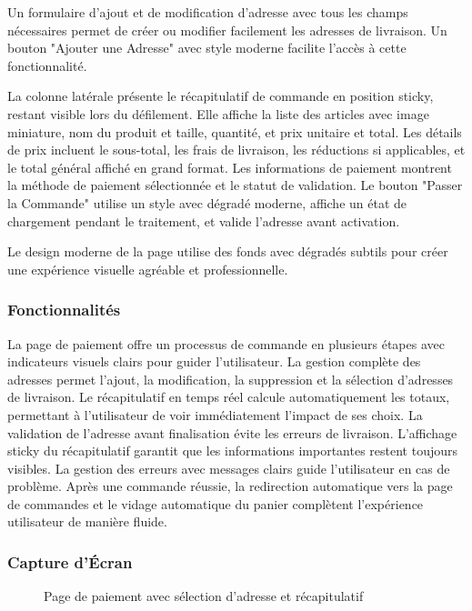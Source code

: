 \documentclass[12pt,a4paper]{article}
\begin{document}
Un formulaire d'ajout et de modification d'adresse avec tous les champs nécessaires permet de créer ou modifier facilement les adresses de livraison. Un bouton "Ajouter une Adresse" avec style moderne facilite l'accès à cette fonctionnalité.

La colonne latérale présente le récapitulatif de commande en position sticky, restant visible lors du défilement. Elle affiche la liste des articles avec image miniature, nom du produit et taille, quantité, et prix unitaire et total. Les détails de prix incluent le sous-total, les frais de livraison, les réductions si applicables, et le total général affiché en grand format. Les informations de paiement montrent la méthode de paiement sélectionnée et le statut de validation. Le bouton "Passer la Commande" utilise un style avec dégradé moderne, affiche un état de chargement pendant le traitement, et valide l'adresse avant activation.

Le design moderne de la page utilise des fonds avec dégradés subtils pour créer une expérience visuelle agréable et professionnelle.

\subsubsection{Fonctionnalités}

La page de paiement offre un processus de commande en plusieurs étapes avec indicateurs visuels clairs pour guider l'utilisateur. La gestion complète des adresses permet l'ajout, la modification, la suppression et la sélection d'adresses de livraison. Le récapitulatif en temps réel calcule automatiquement les totaux, permettant à l'utilisateur de voir immédiatement l'impact de ses choix. La validation de l'adresse avant finalisation évite les erreurs de livraison. L'affichage sticky du récapitulatif garantit que les informations importantes restent toujours visibles. La gestion des erreurs avec messages clairs guide l'utilisateur en cas de problème. Après une commande réussie, la redirection automatique vers la page de commandes et le vidage automatique du panier complètent l'expérience utilisateur de manière fluide.

\subsubsection{Capture d'Écran}

\begin{figure}[H]
    \centering
    \caption{Page de paiement avec sélection d'adresse et récapitulatif}
    \label{fig:checkout}
\end{figure}
\end{document}
